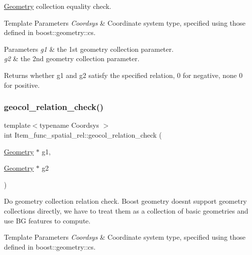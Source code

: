 \mbox{\hyperlink{classGeometry}{Geometry}} collection equality check. 
\begin{DoxyTemplParams}{Template Parameters}
{\em Coordsys} & Coordinate system type, specified using those defined in boost\+::geometry\+::cs. \\
\hline
\end{DoxyTemplParams}

\begin{DoxyParams}{Parameters}
{\em g1} & the 1st geometry collection parameter. \\
\hline
{\em g2} & the 2nd geometry collection parameter. \\
\hline
\end{DoxyParams}
\begin{DoxyReturn}{Returns}
whether g1 and g2 satisfy the specified relation, 0 for negative, none 0 for positive. 
\end{DoxyReturn}
\mbox{\label{classItem__func__spatial__rel_abb5637f13eb30a9a0ef66e0f95f8eff9}} 
\subsubsection{\texorpdfstring{geocol\+\_\+relation\+\_\+check()}{geocol\_relation\_check()}}
{\footnotesize\ttfamily template$<$typename Coordsys $>$ \\
int Item\+\_\+func\+\_\+spatial\+\_\+rel\+::geocol\+\_\+relation\+\_\+check (\begin{DoxyParamCaption}\item[{\mbox{\hyperlink{classGeometry}{Geometry}} $\ast$}]{g1,  }\item[{\mbox{\hyperlink{classGeometry}{Geometry}} $\ast$}]{g2 }\end{DoxyParamCaption})\hspace{0.3cm}{\ttfamily [protected]}}

Do geometry collection relation check. Boost geometry doesn\textquotesingle{}t support geometry collections directly, we have to treat them as a collection of basic geometries and use BG features to compute. 
\begin{DoxyTemplParams}{Template Parameters}
{\em Coordsys} & Coordinate system type, specified using those defined in boost\+::geometry\+::cs. \\
\hline
\end{DoxyTemplParams}

